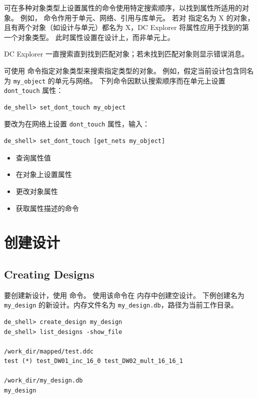 可在多种对象类型上设置属性的命令使用特定搜索顺序，以找到属性所适用的对象。
例如， 命令作用于单元、网络、引用与库单元。
若对  指定名为 X 的对象，且有两个对象（如设计与单元）都名为 X，DC Explorer 将属性应用于找到的第一个对象类型。
此时属性设置在设计上，而非单元上。

DC Explorer 一直搜索直到找到匹配对象；若未找到匹配对象则显示错误消息。

可使用  命令指定对象类型来搜索指定类型的对象。
例如，假定当前设计包含同名为 \texttt{my\_object} 的单元与网络。
下列命令因默认搜索顺序而在单元上设置 \texttt{dont\_touch} 属性：
\begin{lstlisting}
de_shell> set_dont_touch my_object
\end{lstlisting}

要改为在网络上设置 \texttt{dont\_touch} 属性，输入：
\begin{lstlisting}
de_shell> set_dont_touch [get_nets my_object]
\end{lstlisting}

\begin{seeAlsoBox}
\begin{itemize}
  \item 查询属性值
  \item 在对象上设置属性
  \item 更改对象属性
  \item 获取属性描述的命令
\end{itemize}
\end{seeAlsoBox}

\section{创建设计}
\subsection*{Creating Designs}

要创建新设计，使用  命令。
使用该命令在  内存中创建空设计。
下例创建名为 \texttt{my\_design} 的新设计。内存文件名为 \texttt{my\_design.db}，路径为当前工作目录。
\begin{lstlisting}
de_shell> create_design my_design
de_shell> list_designs -show_file

/work_dir/mapped/test.ddc
test (*) test_DW01_inc_16_0 test_DW02_mult_16_16_1

/work_dir/my_design.db
my_design
\end{lstlisting}

